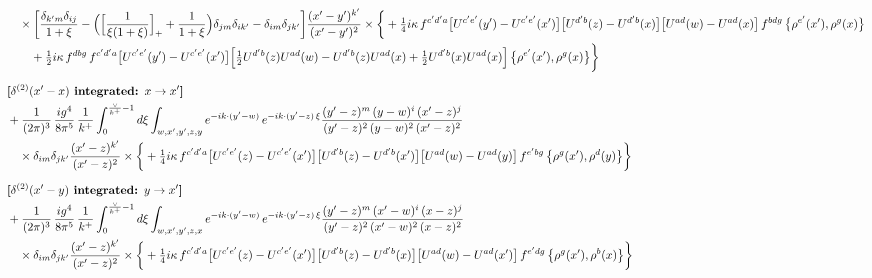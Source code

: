 \documentclass[10pt]{article}
\numberwithin{equation}{section}
\begin{document}
\begin{align}
&\quad\times\bigg[\frac{\delta_{k^{\prime}m}\delta_{ij}}{1+\xi}-\Big(\Big[\frac{1}{\xi(1+\xi)}\Big]_{+}+\frac{1}{1+\xi}\Big)\delta_{jm}\delta_{ik^{\prime}}-\delta_{im}\delta_{jk^{\prime}}\bigg]\frac{(x^{\prime}-y^{\prime})^{k^{\prime}}}{(x^{\prime}-y^{\prime})^{2}}\times\bigg\{+\tfrac14 i\kappa\,f^{c^{\prime}d^{\prime}a}\big[U^{c^{\prime}e^{\prime}}(y^{\prime})-U^{c^{\prime}e^{\prime}}(x^{\prime})\big]\big[U^{d^{\prime}b}(z)-U^{d^{\prime}b}(x)\big]\big[U^{ad}(w)-U^{ad}(x)\big]\,f^{bdg}\,\big\{\rho^{e^{\prime}}(x^{\prime}),\rho^{g}(x)\big\}\notag\\&\qquad+\tfrac12 i\kappa\,f^{dbg}\,f^{c^{\prime}d^{\prime}a}\big[U^{c^{\prime}e^{\prime}}(y^{\prime})-U^{c^{\prime}e^{\prime}}(x^{\prime})\big]\Big[\tfrac12U^{d^{\prime}b}(z)U^{ad}(w)-U^{d^{\prime}b}(z)U^{ad}(x)+\tfrac12U^{d^{\prime}b}(x)U^{ad}(x)\Big]\,\big\{\rho^{e^{\prime}}(x^{\prime}),\rho^{g}(x)\big\}\bigg\}\notag\\[6pt]
&\textbf{[$\delta^{(2)}(x^{\prime}-x)$ integrated: $x\to x^{\prime}$]}\notag\\
&+\frac{1}{(2\pi)^{3}}\,\frac{ig^{4}}{8\pi^{5}}\,\frac{1}{k^{+}}\int_{0}^{\frac{\vee}{k^{+}}-1}d\xi\int_{w,x^{\prime},y^{\prime},z,y}e^{-ik\cdot(y^{\prime}-w)}\,e^{-ik\cdot(y^{\prime}-z)\,\xi}\frac{(y^{\prime}-z)^{m}\,(y-w)^{i}\,(x^{\prime}-z)^{j}}{(y^{\prime}-z)^{2}\,(y-w)^{2}\,(x^{\prime}-z)^{2}}\notag\\
&\quad\times\delta_{im}\delta_{jk^{\prime}}\frac{(x^{\prime}-z)^{k^{\prime}}}{(x^{\prime}-z)^{2}}\times\bigg\{+\tfrac14 i\kappa\,f^{c^{\prime}d^{\prime}a}\big[U^{c^{\prime}e^{\prime}}(z)-U^{c^{\prime}e^{\prime}}(x^{\prime})\big]\big[U^{d^{\prime}b}(z)-U^{d^{\prime}b}(x^{\prime})\big]\big[U^{ad}(w)-U^{ad}(y)\big]\,f^{e^{\prime}bg}\,\big\{\rho^{g}(x^{\prime}),\rho^{d}(y)\big\}\bigg\}\notag\\[6pt]
&\textbf{[$\delta^{(2)}(x^{\prime}-y)$ integrated: $y\to x^{\prime}$]}\notag\\
&+\frac{1}{(2\pi)^{3}}\,\frac{ig^{4}}{8\pi^{5}}\,\frac{1}{k^{+}}\int_{0}^{\frac{\vee}{k^{+}}-1}d\xi\int_{w,x^{\prime},y^{\prime},z,x}e^{-ik\cdot(y^{\prime}-w)}\,e^{-ik\cdot(y^{\prime}-z)\,\xi}\frac{(y^{\prime}-z)^{m}\,(x^{\prime}-w)^{i}\,(x-z)^{j}}{(y^{\prime}-z)^{2}\,(x^{\prime}-w)^{2}\,(x-z)^{2}}\notag\\
&\quad\times\delta_{im}\delta_{jk^{\prime}}\frac{(x^{\prime}-z)^{k^{\prime}}}{(x^{\prime}-z)^{2}}\times\bigg\{+\tfrac14 i\kappa\,f^{c^{\prime}d^{\prime}a}\big[U^{c^{\prime}e^{\prime}}(z)-U^{c^{\prime}e^{\prime}}(x^{\prime})\big]\big[U^{d^{\prime}b}(z)-U^{d^{\prime}b}(x)\big]\big[U^{ad}(w)-U^{ad}(x^{\prime})\big]\,f^{e^{\prime}dg}\,\big\{\rho^{g}(x^{\prime}),\rho^{b}(x)\big\}\bigg\}\notag\\[6pt]

\end{align}
\end{document}
